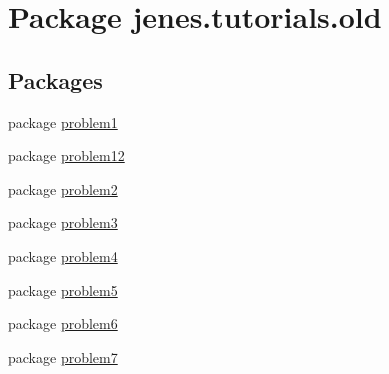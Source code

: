 \hypertarget{namespacejenes_1_1tutorials_1_1old}{\section{Package jenes.\-tutorials.\-old}
\label{namespacejenes_1_1tutorials_1_1old}
}
\subsection*{Packages}
\begin{DoxyCompactItemize}
\item 
package \hyperlink{namespacejenes_1_1tutorials_1_1old_1_1problem1}{problem1}
\item 
package \hyperlink{namespacejenes_1_1tutorials_1_1old_1_1problem12}{problem12}
\item 
package \hyperlink{namespacejenes_1_1tutorials_1_1old_1_1problem2}{problem2}
\item 
package \hyperlink{namespacejenes_1_1tutorials_1_1old_1_1problem3}{problem3}
\item 
package \hyperlink{namespacejenes_1_1tutorials_1_1old_1_1problem4}{problem4}
\item 
package \hyperlink{namespacejenes_1_1tutorials_1_1old_1_1problem5}{problem5}
\item 
package \hyperlink{namespacejenes_1_1tutorials_1_1old_1_1problem6}{problem6}
\item 
package \hyperlink{namespacejenes_1_1tutorials_1_1old_1_1problem7}{problem7}
\end{DoxyCompactItemize}
